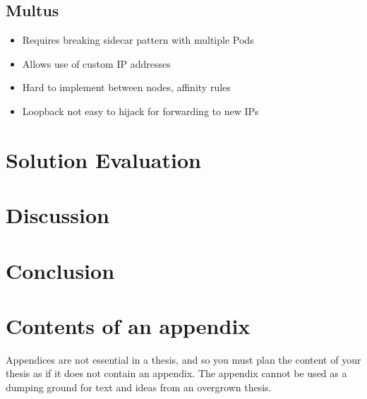 \documentclass[english, 12pt, a4paper, sci, utf8, a-2b, online]{aaltothesis}
\begin{document}
\subsection{Multus}

\begin{itemize}
  \item Requires breaking sidecar pattern with multiple Pods
  \item Allows use of custom IP addresses
  \item Hard to implement between nodes, affinity rules
  \item Loopback not easy to hijack for forwarding to new IPs
\end{itemize}

\clearpage

\section{Solution Evaluation} \label{sec:solution}

\clearpage

\section{Discussion} \label{sec:discussion}

\clearpage

\section{Conclusion} \label{sec:conclusion}

\clearpage

\thesisbibliography
\printbibliography

\clearpage

\thesisappendix

\section{Contents of an appendix}
\label{app:contents}

Appendices are not essential in a thesis, and so you must plan the content of
your thesis as if it does not contain an appendix. The appendix cannot be used
as a dumping ground for text and ideas from an overgrown thesis.
\end{document}
